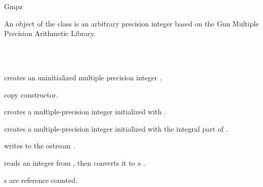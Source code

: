 \begin{ccRefClass} {Gmpz}
\label{Gmpz}

\ccDefinition

An object of the class  is an arbitrary precision integer 
based on the {\sc Gnu} Multiple Precision Arithmetic Library. 


\ccIsModel
{}\\
\\

\ccCreation
{}

             {creates an uninitialized multiple precision integer \ccVar.}

\ccHidden {}
            {copy constructor.}

            {creates a multiple-precision integer initialized with
             .}

            {creates a multiple-precision integer initialized with
             the integral part of .}

\ccOperations
{}
{writes  to the ostream .}

{reads an integer from , then converts it to a .}

\ccImplementation
{}s are reference counted.

\end{ccRefClass} 
